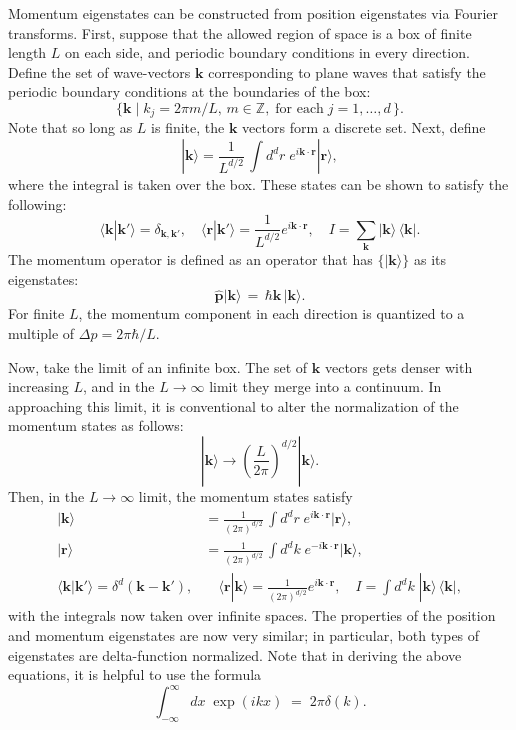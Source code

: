 \documentclass[pra,11pt]{revtex4}
\begin{document}
Momentum eigenstates can be constructed from position eigenstates via
Fourier transforms.  First, suppose that the allowed region of space
is a box of finite length $L$ on each side, and periodic boundary
conditions in every direction.  Define the set of wave-vectors
$\mathbf{k}$ corresponding to plane waves that satisfy the periodic
boundary conditions at the boundaries of the box:
$$\Big\{\mathbf{k}  \; \Big| \; k_j = 2\pi m/L, \,m\in\mathbb{Z}, \;\text{for each} \; j = 1, \dots,d\, \Big\}.$$
Note that so long as $L$ is finite, the $\mathbf{k}$ vectors form a
discrete set.  Next, define
$$|\mathbf{k}\rangle = \frac{1}{L^{d/2}} \, \int d^dr \; e^{i\mathbf{k}\cdot\mathbf{r}} |\mathbf{r}\rangle,$$
where the integral is taken over the box.  These states
can be shown to satisfy the following:
$$\langle\mathbf{k}|\mathbf{k}'\rangle = \delta_{\mathbf{k},\mathbf{k}'}, \quad \langle\mathbf{r}|\mathbf{k}'\rangle = \frac{1}{L^{d/2}} e^{i\mathbf{k}\cdot\mathbf{r}}, \quad I = \sum_{\mathbf{k}} |\mathbf{k}\rangle\,\langle\mathbf{k}|.$$
The momentum operator is defined as an operator that has
$\{|\mathbf{k}\rangle\}$ as its eigenstates:
$$\hat{\mathbf{p}} |\mathbf{k}\rangle \,=\, \hbar \mathbf{k}\, |\mathbf{k}\rangle.$$
For finite $L$, the momentum component in each direction is quantized
to a multiple of $\Delta p = 2\pi\hbar/L$.

Now, take the limit of an infinite box.  The set of $\mathbf{k}$
vectors gets denser with increasing $L$, and in the $L \rightarrow
\infty$ limit they merge into a continuum.  In approaching this limit,
it is conventional to alter the normalization of the momentum states
as follows:
$$|\mathbf{k}\rangle \rightarrow \left(\frac{L}{2\pi}\right)^{d/2} |\mathbf{k}\rangle.$$
Then, in the $L\rightarrow\infty$ limit, the momentum states satisfy
$$\boxed{\begin{aligned} |\mathbf{k}\rangle &= \frac{1}{(2\pi)^{d/2}} \, \int d^dr \; e^{i\mathbf{k}\cdot\mathbf{r}} |\mathbf{r}\rangle, \\ |\mathbf{r}\rangle &= \frac{1}{(2\pi)^{d/2}} \, \int d^dk \; e^{-i\mathbf{k}\cdot\mathbf{r}} |\mathbf{k}\rangle, \\\langle\mathbf{k}|\mathbf{k}'\rangle = \delta^d(\mathbf{k}-\mathbf{k}'),& \quad \langle\mathbf{r}|\mathbf{k}\rangle = \frac{1}{(2\pi)^{d/2}} e^{i\mathbf{k}\cdot\mathbf{r}}, \quad I = \int d^dk \;|\mathbf{k}\rangle\,\langle\mathbf{k}|,\end{aligned}}$$
with the integrals now taken over infinite spaces.  The properties of
the position and momentum eigenstates are now very similar; in
particular, both types of eigenstates are delta-function normalized.
Note that in deriving the above equations, it is helpful to use the formula
$$\int_{-\infty}^\infty dx\; \exp(ikx) \;=\; 2\pi\delta(k).$$
\end{document}
